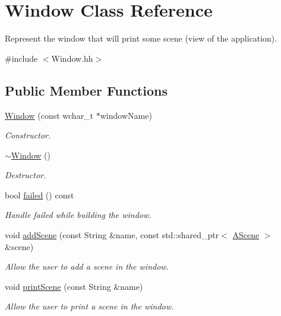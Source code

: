 \hypertarget{classWindow}{}\section{Window Class Reference}
\label{classWindow}


Represent the window that will print some scene (view of the application).  




{\ttfamily \#include $<$Window.\+hh$>$}

\subsection*{Public Member Functions}
\begin{DoxyCompactItemize}
\item 
\hyperlink{classWindow_a25fd6af55e81b781b132166f77daf77e}{Window} (const wchar\+\_\+t $\ast$window\+Name)
\begin{DoxyCompactList}\small\item\em Constructor. \end{DoxyCompactList}\item 
\hyperlink{classWindow_a245d821e6016fa1f6970ccbbedd635f6}{$\sim$\+Window} ()
\begin{DoxyCompactList}\small\item\em Destructor. \end{DoxyCompactList}\item 
bool \hyperlink{classWindow_aa0dde1e5d56fd85fc1615bf34d67c9e0}{failed} () const
\begin{DoxyCompactList}\small\item\em Handle failed while building the window. \end{DoxyCompactList}\item 
void \hyperlink{classWindow_ac9150ac221e5569e677586d5a1123518}{add\+Scene} (const String \&name, const std\+::shared\+\_\+ptr$<$ \hyperlink{classAScene}{A\+Scene} $>$ \&scene)
\begin{DoxyCompactList}\small\item\em Allow the user to add a scene in the window. \end{DoxyCompactList}\item 
void \hyperlink{classWindow_a9e73c1dc8b22cdf16e6446af6f7ade48}{print\+Scene} (const String \&name)
\begin{DoxyCompactList}\small\item\em Allow the user to print a scene in the window. \end{DoxyCompactList}\item 

\end{DoxyCompactItemize}
